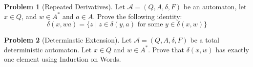 \documentclass[11pt]{article}
\theoremstyle{theorem} %
\theoremstyle{definition} %
\newtheorem{problem}                    {{\color{BurntOrange}Problem}}
\theoremstyle{remark} %
\begin{document}
\begin{problem}
    [Repeated Derivatives]
    Let \(\mathcal A = (Q, A, \delta, F)\) be an automaton, let \(x \in Q\), and \(w \in A^*\) and \(a \in A\).
    Prove the following identity:
    \[
        \delta(x, w a) = \{z \mid z \in \delta(y, a) \text{ for some } y \in \delta(x, w)\}
    \]
\end{problem}

\begin{problem}
    [Determinstic Extension]
    Let \(\mathcal A = (Q, A, \delta, F)\) be a total deterministic automaton.
    Let \(x \in Q\) and \(w \in A^*\).
    Prove that \(\delta(x, w)\) has exactly one element using Induction on Words.
\end{problem}
\end{document}
